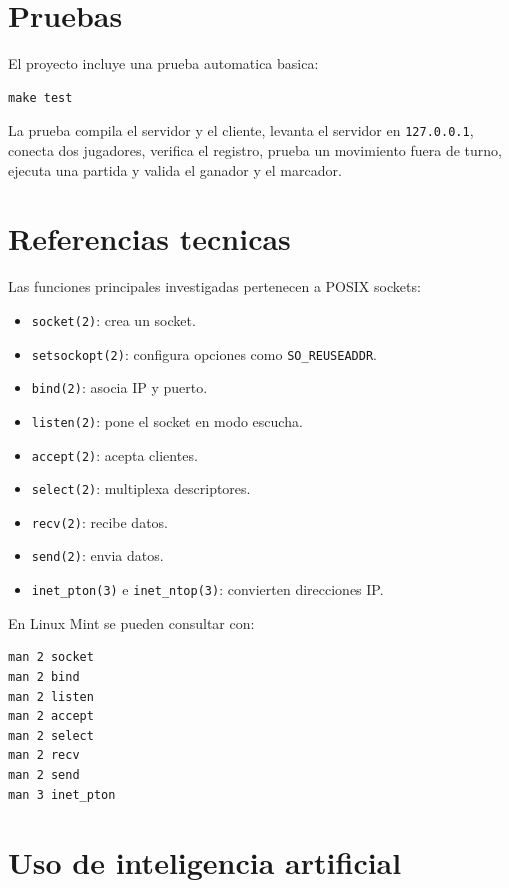 \documentclass[12pt,a4paper]{article}
\begin{document}
\section{Pruebas}

El proyecto incluye una prueba automatica basica:

\begin{lstlisting}[style=code]
make test
\end{lstlisting}

La prueba compila el servidor y el cliente, levanta el servidor en
\texttt{127.0.0.1}, conecta dos jugadores, verifica el registro, prueba un
movimiento fuera de turno, ejecuta una partida y valida el ganador y el marcador.

\section{Referencias tecnicas}

Las funciones principales investigadas pertenecen a POSIX sockets:

\begin{itemize}
    \item \texttt{socket(2)}: crea un socket.
    \item \texttt{setsockopt(2)}: configura opciones como \texttt{SO\_REUSEADDR}.
    \item \texttt{bind(2)}: asocia IP y puerto.
    \item \texttt{listen(2)}: pone el socket en modo escucha.
    \item \texttt{accept(2)}: acepta clientes.
    \item \texttt{select(2)}: multiplexa descriptores.
    \item \texttt{recv(2)}: recibe datos.
    \item \texttt{send(2)}: envia datos.
    \item \texttt{inet\_pton(3)} e \texttt{inet\_ntop(3)}: convierten direcciones IP.
\end{itemize}

En Linux Mint se pueden consultar con:

\begin{lstlisting}[style=code]
man 2 socket
man 2 bind
man 2 listen
man 2 accept
man 2 select
man 2 recv
man 2 send
man 3 inet_pton
\end{lstlisting}

\section{Uso de inteligencia artificial}
\end{document}
